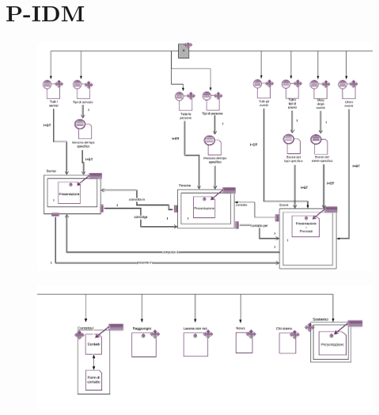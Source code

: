     \section{P-IDM}
    \begin{figure}[H]
        \centering
        \includegraphics[scale=0.5]{resources/images/p-idm1.png}
    \end{figure}
    \begin{figure}[H]
        \centering
        \includegraphics[scale=0.5]{resources/images/p-idm2.png}
    \end{figure}
   